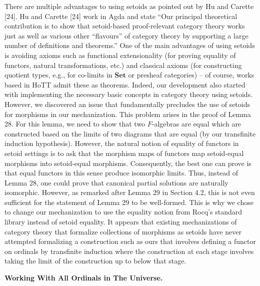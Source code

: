 \documentclass[10pt,a4paper]{article}
\begin{document}
There are multiple advantages to using setoids as pointed out by Hu and Carette [24]. Hu and Carette [24] work in Agda and state “Our principal theoretical contribution is to show that setoid-based proof-relevant category theory works just as well as various other “flavours” of category theory by supporting a large number of definitions and theorems.” One of the main advantages of using setoids is avoiding axioms such as functional extensionality (for proving equality of functors, natural transformations, etc.) and classical axioms (for constructing quotient types, e.g., for co-limits in $\mathbf{Set}$ or presheaf categories) – of course, works based in HoTT admit these as theorems. Indeed, our development also started with implementing the necessary basic concepts in category theory using setoids. However, we discovered an issue that fundamentally precludes the use of setoids for morphisms in our mechanization. This problem arises in the proof of Lemma 28. For this lemma, we need to show that two $F$-algebras are equal which are constructed based on the limits of two diagrams that are equal (by our transfinite induction hypothesis). However, the natural notion of equality of functors in setoid settings is to ask that the morphism maps of functors map setoid-equal morphisms into setoid-equal morphisms. Consequently, the best one can prove is that equal functors in this sense produce isomorphic limits. Thus, instead of Lemma 28, one could prove that canonical partial solutions are naturally isomorphic. However, as remarked after Lemma 29 in Section 4.2, this is not even sufficient for the statement of Lemma 29 to be well-formed. This is why we chose to change our mechanization to use the equality notion from Rocq’s standard library instead of setoid equality. It appears that existing mechanizations of category theory that formalize collections of morphisms as setoids have never attempted formalizing a construction such as ours that involves defining a functor on ordinals by transfinite induction where the construction at each stage involves taking the limit of the construction up to below that stage.\par
 
 
 
 
\par\medskip\noindent\textbf{Working With All Ordinals in The Universe.}\par
 
\end{document}
